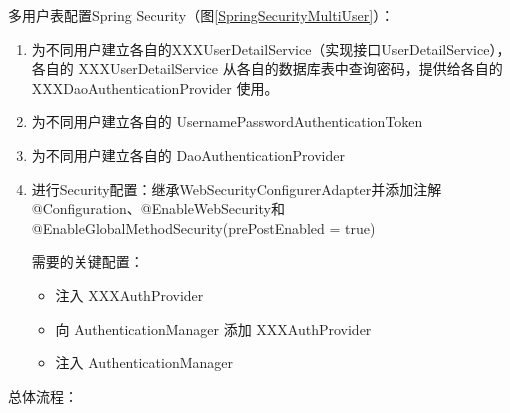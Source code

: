 多用户表配置Spring Security（图\ref{SpringSecurityMultiUser}）：
\begin{enumerate}
  \item 为不同用户建立各自的XXXUserDetailService（实现接口UserDetailService），各自的 XXXUserDetailService 从各自的数据库表中查询密码，提供给各自的 XXXDaoAuthenticationProvider 使用。
  \item 为不同用户建立各自的 UsernamePasswordAuthenticationToken
  \item 为不同用户建立各自的 DaoAuthenticationProvider
  \item 进行Security配置：继承WebSecurityConfigurerAdapter并添加注解@Configuration、@EnableWebSecurity和@EnableGlobalMethodSecurity(prePostEnabled = true)

        需要的关键配置：
        \begin{itemize}
          \item 注入 XXXAuthProvider
          \item 向 AuthenticationManager 添加 XXXAuthProvider
          \item 注入 AuthenticationManager
        \end{itemize}
\end{enumerate}
总体流程：
